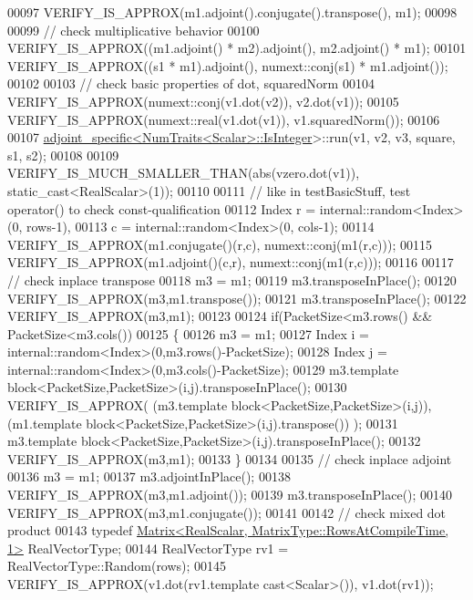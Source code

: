 \begin{DoxyCode}
00097   VERIFY\_IS\_APPROX(m1.adjoint().conjugate().transpose(),    m1);
00098 
00099   \textcolor{comment}{// check multiplicative behavior}
00100   VERIFY\_IS\_APPROX((m1.adjoint() * m2).adjoint(),           m2.adjoint() * m1);
00101   VERIFY\_IS\_APPROX((s1 * m1).adjoint(),                     numext::conj(s1) * m1.adjoint());
00102 
00103   \textcolor{comment}{// check basic properties of dot, squaredNorm}
00104   VERIFY\_IS\_APPROX(numext::conj(v1.dot(v2)),               v2.dot(v1));
00105   VERIFY\_IS\_APPROX(numext::real(v1.dot(v1)),               v1.squaredNorm());
00106   
00107   \hyperlink{structadjoint__specific}{adjoint\_specific<NumTraits<Scalar>::IsInteger}>::run(v1, v2, 
      v3, square, s1, s2);
00108   
00109   VERIFY\_IS\_MUCH\_SMALLER\_THAN(abs(vzero.dot(v1)),  static\_cast<RealScalar>(1));
00110   
00111   \textcolor{comment}{// like in testBasicStuff, test operator() to check const-qualification}
00112   Index r = internal::random<Index>(0, rows-1),
00113       c = internal::random<Index>(0, cols-1);
00114   VERIFY\_IS\_APPROX(m1.conjugate()(r,c), numext::conj(m1(r,c)));
00115   VERIFY\_IS\_APPROX(m1.adjoint()(c,r), numext::conj(m1(r,c)));
00116 
00117   \textcolor{comment}{// check inplace transpose}
00118   m3 = m1;
00119   m3.transposeInPlace();
00120   VERIFY\_IS\_APPROX(m3,m1.transpose());
00121   m3.transposeInPlace();
00122   VERIFY\_IS\_APPROX(m3,m1);
00123   
00124   \textcolor{keywordflow}{if}(PacketSize<m3.rows() && PacketSize<m3.cols())
00125   \{
00126     m3 = m1;
00127     Index i = internal::random<Index>(0,m3.rows()-PacketSize);
00128     Index j = internal::random<Index>(0,m3.cols()-PacketSize);
00129     m3.template block<PacketSize,PacketSize>(i,j).transposeInPlace();
00130     VERIFY\_IS\_APPROX( (m3.template block<PacketSize,PacketSize>(i,j)), (m1.template 
      block<PacketSize,PacketSize>(i,j).transpose()) );
00131     m3.template block<PacketSize,PacketSize>(i,j).transposeInPlace();
00132     VERIFY\_IS\_APPROX(m3,m1);
00133   \}
00134 
00135   \textcolor{comment}{// check inplace adjoint}
00136   m3 = m1;
00137   m3.adjointInPlace();
00138   VERIFY\_IS\_APPROX(m3,m1.adjoint());
00139   m3.transposeInPlace();
00140   VERIFY\_IS\_APPROX(m3,m1.conjugate());
00141 
00142   \textcolor{comment}{// check mixed dot product}
00143   \textcolor{keyword}{typedef} \hyperlink{group___core___module_class_eigen_1_1_matrix}{Matrix<RealScalar, MatrixType::RowsAtCompileTime, 1>}
       RealVectorType;
00144   RealVectorType rv1 = RealVectorType::Random(rows);
00145   VERIFY\_IS\_APPROX(v1.dot(rv1.template cast<Scalar>()), v1.dot(rv1));

\end{DoxyCode}

